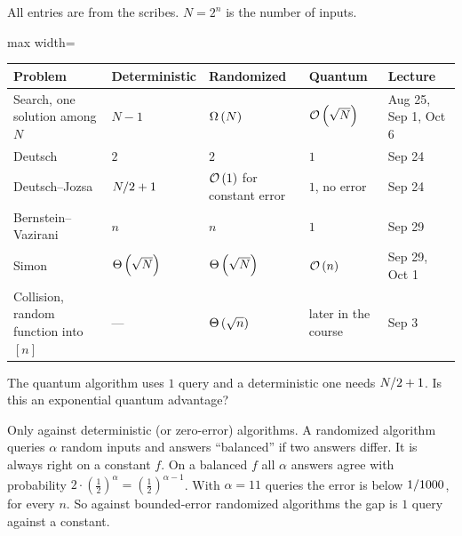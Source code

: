 All entries are from the scribes. $N = 2^n$ is the number of inputs.
\begin{center}
    \begin{adjustbox}{max width=\textwidth}
    \begin{tabular}{lllll}
        \toprule
        Problem                               & Deterministic         & Randomized                       & Quantum             & Lecture              \\ \midrule
        Search, one solution among $N$        & $N - 1$               & $\Omega\left(N\right)$                      & $\mathcal{O}\left(\sqrt{N}\right)$   & Aug 25, Sep 1, Oct 6 \\
        Deutsch                               & $2$                   & $2$                              & $1$                 & Sep 24               \\
        Deutsch--Jozsa                        & $N/2 + 1$    & $\mathcal{O}\left(1\right)$ for constant error    & $1$, no error       & Sep 24               \\
        Bernstein--Vazirani                   & $n$                   & $n$                              & $1$                 & Sep 29               \\
        Simon                                 & $\Theta\left(\sqrt{N}\right)$    & $\Theta\left(\sqrt{N}\right)$               & $\mathcal{O}\left(n\right)$          & Sep 29, Oct 1        \\
        Collision, random function into $[n]$ & ---                   & $\Theta\left(\sqrt{n}\right)$               & later in the course & Sep 3                \\ \bottomrule
    \end{tabular}
    \end{adjustbox}
\end{center}

\begin{exercisebox}
\begin{pproblem}\label{pp:dj-speedup}
    The quantum algorithm uses $1$ query and a deterministic one needs $N/2 + 1$. Is this
    an exponential quantum advantage?
\end{pproblem}
\tcblower
\begin{wsolution}
    Only against deterministic (or zero-error) algorithms. A randomized algorithm queries $\alpha$
    random inputs and answers ``balanced'' if two answers differ. It is always right on a constant
    $f$. On a balanced $f$ all $\alpha$ answers agree with probability
    $2 \cdot \left(\frac{1}{2}\right)^{\alpha} = \left(\frac{1}{2}\right)^{\alpha - 1}$. With
    $\alpha = 11$ queries the error is below $1/1000$, for every $n$. So against
    bounded-error randomized algorithms the gap is $1$ query against a constant.
\end{wsolution}
\end{exercisebox}

